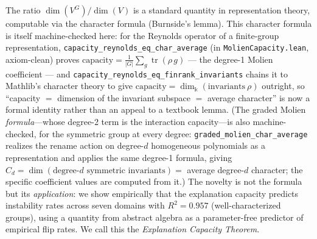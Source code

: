 \documentclass[11pt,a4paper]{article}
\begin{document}
The ratio $\dim(V^G)/\dim(V)$ is a standard quantity in representation theory, computable via the character formula (Burnside's lemma).  This character formula is itself machine-checked here: for the Reynolds operator of a finite-group representation, \texttt{capacity\_reynolds\_eq\_char\_average} (in \texttt{MolienCapacity.lean}, axiom-clean) proves $\mathrm{capacity} = \tfrac{1}{|G|}\sum_g \operatorname{tr}(\rho\,g)$ --- the degree-1 Molien coefficient --- and \texttt{capacity\_reynolds\_eq\_finrank\_invariants} chains it to Mathlib's character theory to give $\mathrm{capacity} = \dim_{\mathbb{k}}(\text{invariants}\ \rho)$ outright, so ``capacity $=$ dimension of the invariant subspace $=$ average character'' is now a formal identity rather than an appeal to a textbook lemma.  (The graded Molien \emph{formula}---whose degree-2 term is the interaction capacity---is also machine-checked, for the symmetric group at every degree: \texttt{graded\_molien\_char\_average} realizes the rename action on degree-$d$ homogeneous polynomials as a representation and applies the same degree-1 formula, giving $C_d = \dim(\text{degree-}d\text{ symmetric invariants}) = $ average degree-$d$ character; the specific coefficient values are computed from it.)  The novelty is not the formula but its \emph{application}: we show empirically that the explanation capacity predicts instability rates across seven domains with $R^2 = 0.957$ (well-characterized groups), using a quantity from abstract algebra as a parameter-free predictor of empirical flip rates.  We call this the \emph{Explanation Capacity Theorem}.
\end{document}
